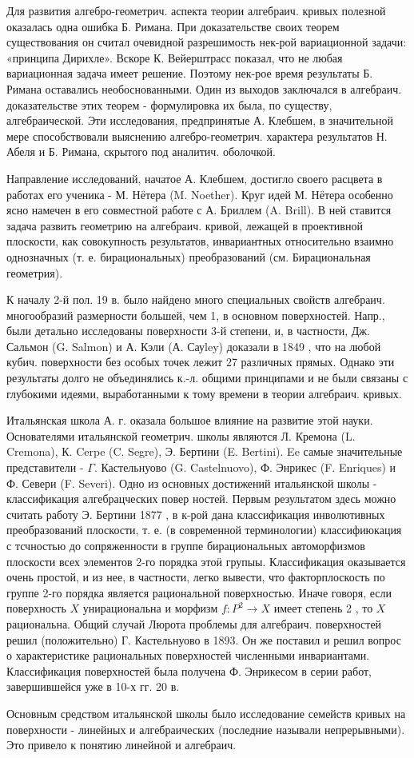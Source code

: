 \documentclass[10pt]{article}
\begin{document}
Для развития алгебро-геометрич. аспекта теории алгебраич. кривых полезной оказалась одна ошибка Б. Римана. При доказательстве своих теорем существования он считал очевидной разрешимость нек-рой вариационной задачи: «принципа Дирихле». Вскоре К. Вейерштрасс показал, что не любая вариационная задача имеет решение. Поэтому нек-рое время результаты Б. Римана оставались необоснованными. Один из выходов заключался в алгебраич. доказательстве этих теорем - формулировка их была, по существу, алгебраической. Эти исследования, предпринятые А. Клебшем, в значительной мере способствовали выяснению алгебро-геометрич. характера результатов Н. Абеля и Б. Римана, скрытого под аналитич. оболочкой.



Направление исследований, начатое А. Клебшем, достигло своего расцвета в работах его ученика - М. Нётера (M. Noether). Круг идей М. Нётера особенно ясно намечен в его совместной работе с А. Бриллем (A. Brill). В ней ставится задача развить геометрию на алгебраич. кривой, лежащей в проективной плоскости, как совокупность результатов, инвариантных относительно взаимно однозначных (т. е. бирациональных) преобразований (см. Бирациональная геометрия).



К началу 2-й пол. 19 в. было найдено много специальных свойств алгебраич. многообразий размерности большей, чем 1, в основном поверхностей. Напр., были детально исследованы поверхности 3-й степени, и, в частности, Дж. Сальмон (G. Salmon) и А. Кэли (А. Сауley) доказали в 1849 , что на любой кубич. поверхности без особых точек лежит 27 различных прямых. Однако эти результаты долго не объединялись к.-л. общими принципами и не были связаны с глубокими идеями, выработанными к тому времени в теории алгебраич. кривых.



Итальянская школа А. г. оказала большое влияние на развитие этой науки. Основателями итальянской геометрич. школы являются Л. Кремона (L. Cremona), К. Cerpe (C. Segre), Э. Бертини (E. Bertini). Ee самые значительные представители - $\Gamma$. Кастельнуово (G. Castelnuovo), Ф. Энрикес (F. Enriques) и Ф. Севери (F. Severi). Одно из основных достижений итальянской школы - классификация алгебрацческих повер ностей. Первым результатом здесь можно считать работу Э. Бертини 1877 , в к-рой дана классификация инволютивных преобразований плоскости, т. е. (в современной терминологии) классифиюкация с тсчностью до сопряженности в группе бирациональных автоморфизмов плоскости всех элементов 2-го порядка этоӥ групыы. Классификация оказывается очень простой, и из нее, в частности, легко вывести, что факторплоскость по группе 2-го порядка является рациональной поверхностью. Иначе говоря, если поверхность $X$ унирациональна и морфизм $f: P^{2} \rightarrow X$ имеет степень 2 , то $X$ рациональна. Общий случай Люрота проблемы для алгебраич. поверхностей решил (положительно) Г. Кастельнуово в 1893. Он же поставил и решил вопрос о характеристике рациональных поверхностей численными инвариантами. Классификация поверхностей была получена Ф. Энрикесом в серии работ, завершившейся уже в 10-х гг. 20 в.



Основным средством итальянской школы было исследование семейств кривых на поверхности - линейных и алгебраических (последние называли непрерывными). Это привело к понятию линейной и алгебраич.
\end{document}
